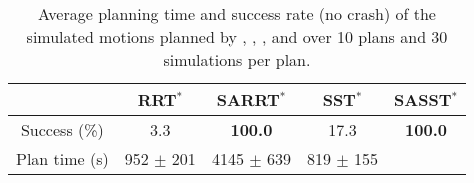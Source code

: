 \begin{table*}[t]
    \centering
    \begin{tabular}{l|llll|}
    \cline{2-5}
        & \multicolumn{1}{c|}{RRT$^{*}$} & \multicolumn{1}{c|}{SARRT$^*$} & \multicolumn{1}{c|}{SST$^*$} & \multicolumn{1}{c|}{SASST$^*$} \\ \hline
    \multicolumn{1}{|c|}{Success (\%)} & \multicolumn{1}{c|}{3.3} & \multicolumn{1}{c|}{\textbf{100.0}}  & \multicolumn{1}{c|}{17.3}  &  \multicolumn{1}{c|}{\textbf{100.0}}   \\ \hline
    \multicolumn{1}{|c|}{Plan time (s)} & \multicolumn{1}{c|}{952 $\pm$ 201}   & \multicolumn{1}{c|}{4145 $\pm$ 639} & \multicolumn{1}{c|}{819 $\pm$ 155}  &   \multicolumn{1}{c|}{ }  \\ \hline
    \end{tabular}
    \caption{
    \label{tab:samp_unicycle}
    Average planning time and success rate (no crash) of the simulated motions planned by , , , and  over 10 plans and 30 simulations per plan.}
\end{table*}